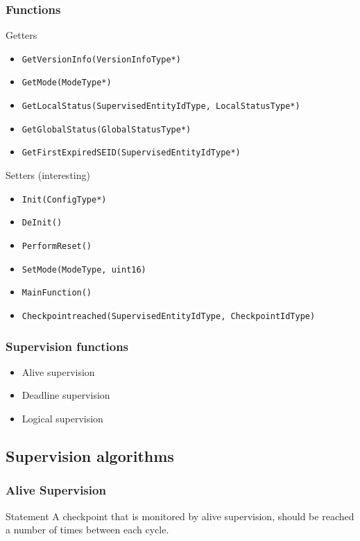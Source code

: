 \documentclass{beamer}
\begin{document}
\begin{frame}[fragile]
  \frametitle{Functions}
  \begin{block}{Getters}
    \begin{itemize}
      \item \lstinline!GetVersionInfo(VersionInfoType*)!
      \item \lstinline!GetMode(ModeType*)!
      \item \lstinline!GetLocalStatus(SupervisedEntityIdType, LocalStatusType*)!
      \item \lstinline!GetGlobalStatus(GlobalStatusType*)!
      \item \lstinline!GetFirstExpiredSEID(SupervisedEntityIdType*)!
    \end{itemize}
  \end{block}

  \begin{block}{Setters (interesting)}
    \begin{itemize}
      \item \lstinline!Init(ConfigType*)!
      \item \lstinline!DeInit()!
      \item \lstinline!PerformReset()!
      \item \lstinline!SetMode(ModeType, uint16)!
      \item \lstinline!MainFunction()!
      \item \lstinline!Checkpointreached(SupervisedEntityIdType, CheckpointIdType)!
    \end{itemize}
  \end{block}
\end{frame}

\begin{frame}
  \frametitle{Supervision functions}
  \begin{itemize}
    \item Alive supervision
    \item Deadline supervision
    \item Logical supervision
  \end{itemize}
\end{frame}

\subsection{Supervision algorithms}
\begin{frame}
  \frametitle{Alive Supervision}
  \begin{block}{Statement}
    A checkpoint that is monitored by alive supervision, should be
    reached a number of times between each cycle.
  \end{block}
\end{frame}
\end{document}
